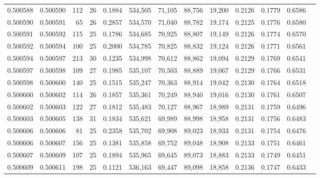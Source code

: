 \begin{tabular}{rrrrrrrrrrrrr}
0.500588 & 0.500590 & 112 &  26 &                                     0.1884 & 534,505 &  71,105 &  88,756 &  19,200 & 0.2126 & 0.1779 & 0.6586 \\
0.500590 & 0.500591 &  65 &  26 &                                     0.2857 & 534,570 &  71,040 &  88,782 &  19,174 & 0.2125 & 0.1776 & 0.6580 \\
0.500591 & 0.500592 & 115 &  25 &                                     0.1786 & 534,685 &  70,925 &  88,807 &  19,149 & 0.2126 & 0.1774 & 0.6570 \\
0.500592 & 0.500594 & 100 &  25 &                                     0.2000 & 534,785 &  70,825 &  88,832 &  19,124 & 0.2126 & 0.1771 & 0.6561 \\
0.500594 & 0.500597 & 213 &  30 &                                     0.1235 & 534,998 &  70,612 &  88,862 &  19,094 & 0.2129 & 0.1769 & 0.6541 \\
0.500597 & 0.500598 & 109 &  27 &                                     0.1985 & 535,107 &  70,503 &  88,889 &  19,067 & 0.2129 & 0.1766 & 0.6531 \\
0.500598 & 0.500600 & 140 &  25 &                                     0.1515 & 535,247 &  70,363 &  88,914 &  19,042 & 0.2130 & 0.1764 & 0.6518 \\
0.500600 & 0.500602 & 114 &  26 &                                     0.1857 & 535,361 &  70,249 &  88,940 &  19,016 & 0.2130 & 0.1761 & 0.6507 \\
0.500602 & 0.500603 & 122 &  27 &                                     0.1812 & 535,483 &  70,127 &  88,967 &  18,989 & 0.2131 & 0.1759 & 0.6496 \\
0.500603 & 0.500605 & 138 &  31 &                                     0.1834 & 535,621 &  69,989 &  88,998 &  18,958 & 0.2131 & 0.1756 & 0.6483 \\
0.500606 & 0.500606 &  81 &  25 &                                     0.2358 & 535,702 &  69,908 &  89,023 &  18,933 & 0.2131 & 0.1754 & 0.6476 \\
0.500606 & 0.500607 & 156 &  25 &                                     0.1381 & 535,858 &  69,752 &  89,048 &  18,908 & 0.2133 & 0.1751 & 0.6461 \\
0.500607 & 0.500609 & 107 &  25 &                                     0.1894 & 535,965 &  69,645 &  89,073 &  18,883 & 0.2133 & 0.1749 & 0.6451 \\
0.500609 & 0.500611 & 198 &  25 &                                     0.1121 & 536,163 &  69,447 &  89,098 &  18,858 & 0.2136 & 0.1747 & 0.6433 \\

\end{tabular}
